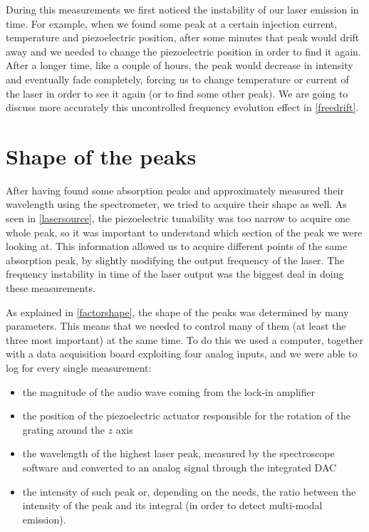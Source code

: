 During this measurements we first noticed the instability of our laser emission in time. For example, when we found some peak at a certain injection current, temperature and piezoelectric position, after some minutes that peak would drift away and we needed to change the piezoelectric position in order to find it again. After a longer time, like a couple of hours, the peak would decrease in intensity and eventually fade completely, forcing us to change temperature or current of the laser
in order to see it again (or to find some other peak). We are going to discuss more accurately this uncontrolled frequency evolution effect in \cref{freedrift}. 

\section{Shape of the peaks}\label{shapeaks}
\label{factorsinfluencingtheshapeofthepeaks}
After having found some absorption peaks and approximately measured their wavelength using the spectrometer, we tried to acquire their shape as well. As seen in \cref{lasersource}, the piezoelectric tunability was too narrow to acquire one whole peak, so it was important to understand which section of the peak we were looking at. This information allowed us to acquire different points of the same absorption peak, by slightly modifying the output frequency of the laser. The frequency instability in time of the laser output was the biggest deal in doing these measurements. 

As explained in \cref{factorshape}, the shape of the peaks was determined by many parameters. This means that we needed to control many of them (at least the three most important) at the same time. To do this we used a computer, together with a data acquisition board exploiting four analog inputs, and we were able to log for every single measurement:
\begin{itemize}
	\item the magnitude of the audio wave coming from the lock-in amplifier
	\item the position of the piezoelectric actuator responsible for the rotation of the grating around the $z$ axis
	\item the wavelength of the highest laser peak, measured by the spectroscope software and converted to an analog signal through the integrated DAC
	\item the intensity of such peak or, depending on the needs, the ratio between the intensity of the peak and its integral (in order to detect multi-modal emission).
\end{itemize}

